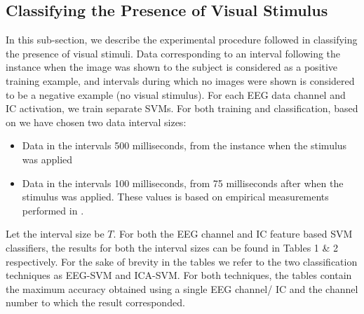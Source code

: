 \documentclass{article} %
\begin{document}
\begin{table}[t]
\begin{center}
\begin{tabular}{c|c|cc|cc}
		\end{tabular}
	\end{center}
\end{table}

\subsection{Classifying the Presence of Visual Stimulus}
In this sub-section, we describe the experimental procedure followed in classifying the presence of visual stimuli. Data corresponding to an interval following the instance when the image was shown to the subject is considered as a positive training example, and intervals during which no images were shown is considered to be a negative example (no visual stimulus). For each EEG data channel and IC activation, we train separate SVMs. For both training and classification, based on \cite{Stewart20141} we have chosen two data interval sizes:

\begin{itemize}
	\item Data in the intervals 500 milliseconds, from the instance when the stimulus was applied
	\item Data in the intervals 100 milliseconds, from 75 milliseconds after when the stimulus was applied. These values is based on empirical measurements performed in \cite{Stewart20141}.
\end{itemize}
Let the interval size be $T$. For both the EEG channel and IC feature based SVM classifiers, the results for both the interval sizes can be found in Tables 1 \& 2 respectively. For the sake of brevity in the tables we refer to the two classification techniques as EEG-SVM and ICA-SVM. For both techniques, the tables contain the maximum accuracy obtained using a single EEG channel/ IC and the channel number to which the result corresponded.
\end{document}
